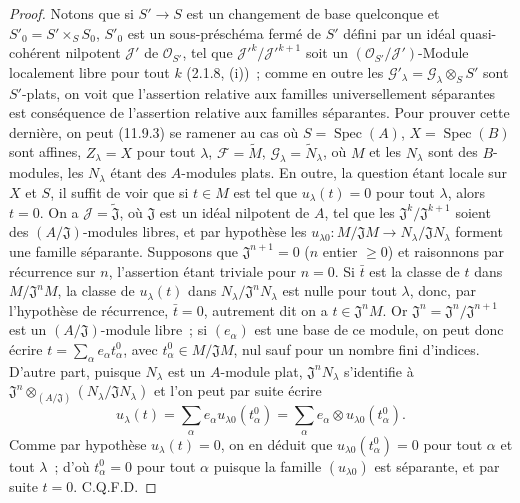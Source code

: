 \begin{proof}
Notons que si $S'\to S$ est un changement de base quelconque et
$S'_0=S'\times_S S_0$, $S'_0$ est un sous-préschéma fermé de $S'$ défini par
un idéal quasi-cohérent nilpotent $\mathcal J'$ de $\mathcal O_{S'}$, tel que
$\mathcal J'^k/\mathcal J'^{k+1}$ soit un
$(\mathcal O_{S'}/\mathcal J')$-Module localement libre pour tout $k$
(2.1.8, (i))~; comme en outre les
$\mathcal G'_\lambda=\mathcal G_\lambda\otimes_S S'$ sont $S'$-plats, on voit
que l'assertion relative aux familles universellement séparantes est
conséquence de l'assertion relative aux familles séparantes. Pour prouver
cette dernière, on peut (11.9.3) se ramener au cas où
$S=\operatorname{Spec}(A)$, $X=\operatorname{Spec}(B)$ sont affines,
$Z_\lambda=X$ pour tout $\lambda$, $\mathcal F=\widetilde M$,
$\mathcal G_\lambda=\widetilde N_\lambda$, où $M$ et les $N_\lambda$ sont des
$B$-modules, les $N_\lambda$ étant des $A$-modules plats. En outre, la question
étant locale sur $X$ et $S$, il suffit de voir que si $t\in M$ est tel que
$u_\lambda(t)=0$ pour tout $\lambda$, alors $t=0$. On a
$\mathcal J=\widetilde{\mathfrak J}$, où $\mathfrak J$ est un idéal nilpotent
de $A$, tel que les $\mathfrak J^k/\mathfrak J^{k+1}$ soient des
$(A/\mathfrak J)$-modules libres, et par hypothèse les
$u_{\lambda0}:M/\mathfrak JM\to N_\lambda/\mathfrak JN_\lambda$ forment une
famille séparante. Supposons que $\mathfrak J^{n+1}=0$ ($n$ entier $\geq0$) et
raisonnons par récurrence sur $n$, l'assertion étant triviale pour $n=0$. Si
$\bar t$ est la classe de $t$ dans $M/\mathfrak J^nM$, la classe de
$u_\lambda(t)$ dans $N_\lambda/\mathfrak J^nN_\lambda$ est nulle pour tout
$\lambda$, donc, par l'hypothèse de récurrence, $\bar t=0$, autrement dit on a
$t\in\mathfrak J^nM$. Or
$\mathfrak J^n=\mathfrak J^n/\mathfrak J^{n+1}$ est un
$(A/\mathfrak J)$-module libre~; si $(e_\alpha)$ est une base de ce module, on
peut donc écrire $t=\sum_\alpha e_\alpha t^0_\alpha$, avec
$t^0_\alpha\in M/\mathfrak JM$, nul sauf pour un nombre fini d'indices.
D'autre part, puisque $N_\lambda$ est un $A$-module plat,
$\mathfrak J^nN_\lambda$ s'identifie à
$\mathfrak J^n\otimes_{(A/\mathfrak J)}(N_\lambda/\mathfrak JN_\lambda)$ et
l'on peut par suite écrire
\[
u_\lambda(t)=\sum_\alpha e_\alpha u_{\lambda0}(t^0_\alpha)
=\sum_\alpha e_\alpha\otimes u_{\lambda0}(t^0_\alpha).
\]
Comme par hypothèse $u_\lambda(t)=0$, on en déduit que
$u_{\lambda0}(t^0_\alpha)=0$ pour tout $\alpha$ et tout $\lambda$~; d'où
$t^0_\alpha=0$ pour tout $\alpha$ puisque la famille $(u_{\lambda0})$ est
séparante, et par suite $t=0$. C.Q.F.D.
\end{proof}

